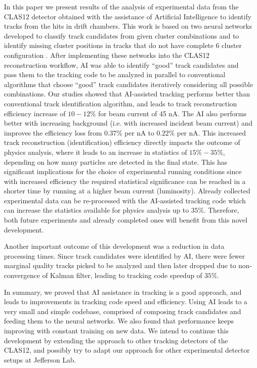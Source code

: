 In this paper we present results of the analysis of experimental data from the CLAS12 detector obtained with the assistance of Artificial Intelligence
to identify tracks from the hits in drift chambers. This work is based on two neural networks developed to classify track candidates from
given cluster combinations \cite{Gavalian:2020oxg} and to identify missing cluster positions in tracks that do not have complete 6 cluster configuration \cite{Gavalian:2020xmc}. After implementing these networks into the CLAS12 reconstruction workflow, AI was able to identify ``good'' track candidates 
and pass them to the tracking code to be analyzed in parallel to conventional algorithms that choose ``good'' track candidates iteratively considering all possible combinations. 
Our studies showed that AI-assisted tracking performs better than conventional track identification algorithm, and leads to track reconstruction efficiency increase of $10-12\%$ for beam current of 45 nA. The AI also performs better with increasing background (i.e. with increased incident beam current) and improves the efficiency loss from $0.37\%$ per nA to $0.22\%$ per nA.
This increased track reconstruction (identification) efficiency directly impacts the outcome of physics analysis, where it leads to an increase in statistics of 
$15\%-35\%$, depending on how many particles are detected in the final state. This has significant implications for the choice of experimental running conditions since with increased efficiency the required statistical significance can be reached in a shorter time by running at a higher beam current (luminosity). Already collected experimental data can be re-processed with the AI-assisted tracking
code which can increase the statistics available for physics analysis up to $35\%$. Therefore, both future experiments and already completed ones will benefit 
from this novel development.

Another important outcome of this development was a reduction in data processing times. Since track candidates were identified by AI, there were fewer marginal quality tracks picked to be analyzed and then later dropped due to non-convergence of Kalman filter, leading to tracking code speedup of $35\%$.

In summary, we proved that AI assistance in tracking is a good approach, and leads to improvements in tracking code speed and efficiency. 
Using AI leads to a very small and simple codebase, comprised of composing track candidates and feeding them to the neural networks. 
We also found that performance keeps improving with constant training on new data. We intend to continue this development by extending 
the approach to other tracking detectors of the CLAS12, and possibly try to adapt our approach for other experimental detector setups at Jefferson Lab.

